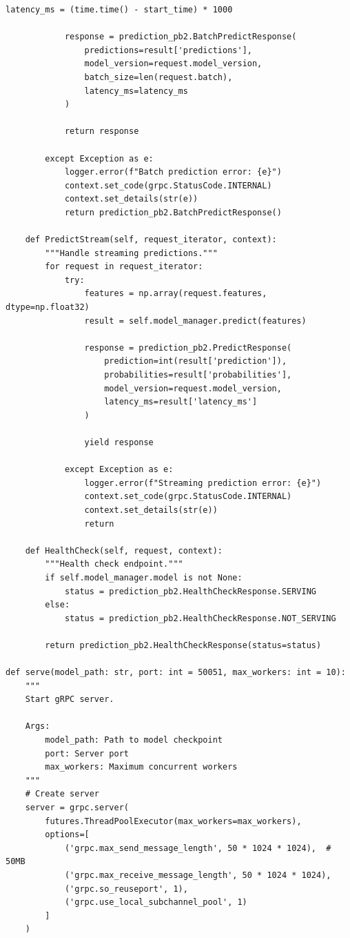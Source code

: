 \begin{lstlisting}[style=python, caption=gRPC server implementation]
            latency_ms = (time.time() - start_time) * 1000

            response = prediction_pb2.BatchPredictResponse(
                predictions=result['predictions'],
                model_version=request.model_version,
                batch_size=len(request.batch),
                latency_ms=latency_ms
            )

            return response

        except Exception as e:
            logger.error(f"Batch prediction error: {e}")
            context.set_code(grpc.StatusCode.INTERNAL)
            context.set_details(str(e))
            return prediction_pb2.BatchPredictResponse()

    def PredictStream(self, request_iterator, context):
        """Handle streaming predictions."""
        for request in request_iterator:
            try:
                features = np.array(request.features, dtype=np.float32)
                result = self.model_manager.predict(features)

                response = prediction_pb2.PredictResponse(
                    prediction=int(result['prediction']),
                    probabilities=result['probabilities'],
                    model_version=request.model_version,
                    latency_ms=result['latency_ms']
                )

                yield response

            except Exception as e:
                logger.error(f"Streaming prediction error: {e}")
                context.set_code(grpc.StatusCode.INTERNAL)
                context.set_details(str(e))
                return

    def HealthCheck(self, request, context):
        """Health check endpoint."""
        if self.model_manager.model is not None:
            status = prediction_pb2.HealthCheckResponse.SERVING
        else:
            status = prediction_pb2.HealthCheckResponse.NOT_SERVING

        return prediction_pb2.HealthCheckResponse(status=status)

def serve(model_path: str, port: int = 50051, max_workers: int = 10):
    """
    Start gRPC server.

    Args:
        model_path: Path to model checkpoint
        port: Server port
        max_workers: Maximum concurrent workers
    """
    # Create server
    server = grpc.server(
        futures.ThreadPoolExecutor(max_workers=max_workers),
        options=[
            ('grpc.max_send_message_length', 50 * 1024 * 1024),  # 50MB
            ('grpc.max_receive_message_length', 50 * 1024 * 1024),
            ('grpc.so_reuseport', 1),
            ('grpc.use_local_subchannel_pool', 1)
        ]
    )


\end{lstlisting}
